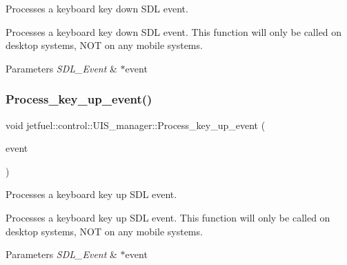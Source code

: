 Processes a keyboard key down S\+DL event. 

Processes a keyboard key down S\+DL event. This function will only be called on desktop systems, N\+OT on any mobile systems.


\begin{DoxyParams}{Parameters}
{\em S\+D\+L\+\_\+\+Event} & $\ast$event \\
\hline
\end{DoxyParams}
\mbox{\label{classjetfuel_1_1control_1_1UIS__manager_a43156fbe06f42df6cdeef4f3c5baa253}} 
\subsubsection{\texorpdfstring{Process\+\_\+key\+\_\+up\+\_\+event()}{Process\_key\_up\_event()}}
{\footnotesize\ttfamily void jetfuel\+::control\+::\+U\+I\+S\+\_\+manager\+::\+Process\+\_\+key\+\_\+up\+\_\+event (\begin{DoxyParamCaption}\item[{S\+D\+L\+\_\+\+Event $\ast$}]{event }\end{DoxyParamCaption})\hspace{0.3cm}{\ttfamily [protected]}}



Processes a keyboard key up S\+DL event. 

Processes a keyboard key up S\+DL event. This function will only be called on desktop systems, N\+OT on any mobile systems.


\begin{DoxyParams}{Parameters}
{\em S\+D\+L\+\_\+\+Event} & $\ast$event \\
\hline
\end{DoxyParams}
\mbox{\label{classjetfuel_1_1control_1_1UIS__manager_ac2bf8de30a754bdc0a2bd300a79d41bb}} 
